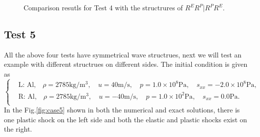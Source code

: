 \documentclass[review]{elsarticle}
\begin{document}
\begin{enumerate}[Step 1]
\begin{figure}
    \caption{Comparison resutls for Test 4 with the structrures of $R^ER^P|R^PR^E$.  }
  \label{fig:case4}
\end{figure}
\subsection{Test 5}
All the above four tests have symmetrical wave  structrues, next we will test an example with different structrues on different sides. The initial condition is given as
\begin{equation}
 \left\{ \begin{aligned}
&	 \text{L: Al,}\quad  \rho = 2785 \text{kg}/\text{m}^3, \quad  u = 40\text{m}/\text{s}, \quad  p = 1.0\times 10^8\text{Pa}, \quad  s_{xx}=-2.0\times 10^8 \text{Pa},\\
&	 \text{R: Al,}\quad  \rho = 2785 \text{kg}/\text{m}^3, \quad  u = -40\text{m}/\text{s}, \quad  p = 1.0 \times 10^2 \text{Pa}, \quad  s_{xx}=0.0\text{Pa}.\\
   \end{aligned}
 \right.
\end{equation}
In the Fig.\ref{fig:case5} shown in both the numerical and exact solutions, there is one plastic shock on the left side and both the elastic and plastic shocks exist on the right.  

\begin{figure}
  \centering


\end{figure}
\end{enumerate}
\end{document}
